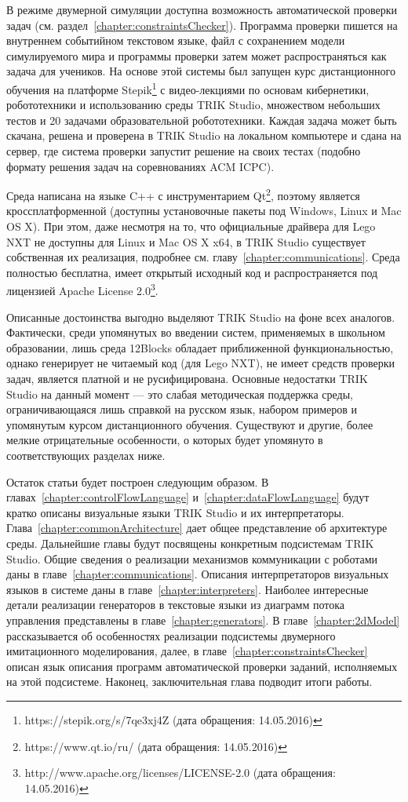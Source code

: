 \documentclass[conference]{IEEEtran}
\begin{document}
В режиме двумерной симуляции доступна возможность автоматической проверки задач (см. раздел~\ref{chapter:constraintsChecker}). Программа проверки пишется на внутреннем событийном текстовом языке, файл с сохранением модели симулируемого мира и программы проверки затем может распространяться как задача для учеников. На основе этой системы был запущен курс дистанционного обучения на платформе Stepik\footnote{https://stepik.org/s/7qe3xj4Z  (дата обращения: 14.05.2016)} с видео-лекциями по основам кибернетики, робототехники и использованию среды TRIK Studio, множеством небольших тестов и 20 задачами образовательной робототехники. Каждая задача может быть скачана, решена и проверена в TRIK Studio на локальном компьютере и сдана на сервер, где система проверки запустит решение на своих тестах (подобно формату решения задач на соревнованиях ACM ICPC).

Среда написана на языке C++ с инструментарием Qt\footnote{https://www.qt.io/ru/ (дата обращения: 14.05.2016)}, поэтому является кроссплатформенной (доступны установочные пакеты под Windows, Linux и Mac OS X). При этом, даже несмотря на то, что официальные драйвера для Lego NXT не доступны для Linux и Mac OS X x64, в TRIK Studio существует собственная их реализация, подробнее см. главу~\ref{chapter:communications}. Среда полностью бесплатна, имеет открытый исходный код и распространяется под лицензией Apache License 2.0\footnote{http://www.apache.org/licenses/LICENSE-2.0 (дата обращения: 14.05.2016)}.

Описанные достоинства выгодно выделяют TRIK Studio на фоне всех аналогов. Фактически, среди упомянутых во введении систем, применяемых в школьном образовании, лишь среда 12Blocks обладает приближенной функциональностью, однако генерирует не читаемый код (для Lego NXT), не имеет средств проверки задач, является платной и не русифицирована. Основные недостатки TRIK Studio на данный момент --- это слабая методическая поддержка среды, ограничивающаяся лишь справкой на русском язык, набором примеров и упомянутым курсом дистанционного обучения. Существуют и другие, более мелкие отрицательные особенности, о которых будет упомянуто в соответствующих разделах ниже.

Остаток статьи будет построен следующим образом. В главах~\ref{chapter:controlFlowLanguage} и~\ref{chapter:dataFlowLanguage} будут кратко описаны визуальные языки TRIK Studio и их интерпретаторы. Глава~\ref{chapter:commonArchitecture} дает общее представление об архитектуре среды. Дальнейшие главы будут посвящены конкретным подсистемам TRIK Studio. Общие сведения о реализации механизмов коммуникации с роботами даны в главе~\ref{chapter:communications}. Описания интерпретаторов визуальных языков в системе даны в главе~\ref{chapter:interpreters}. Наиболее интересные детали реализации генераторов в текстовые языки из диаграмм потока управления представлены в главе~\ref{chapter:generators}. В главе~\ref{chapter:2dModel} рассказывается об особенностях реализации подсистемы двумерного имитационного моделирования, далее, в главе~\ref{chapter:constraintsChecker} описан язык описания программ автоматической проверки заданий, исполняемых на этой подсистеме. Наконец, заключительная глава подводит итоги работы.
\end{document}
